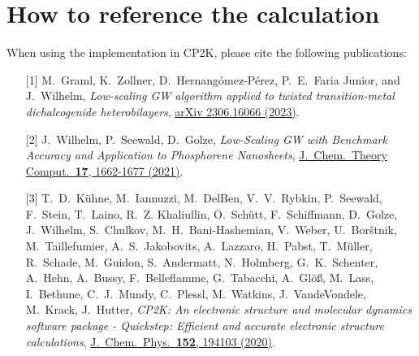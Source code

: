 \documentclass[11pt, a4paper]{scrartcl}
\begin{document}
\section{How to reference the \GW calculation}
When using the \GW implementation in CP2K, please cite the following publications:
\begin{enumerate}[leftmargin=*]

\item[[1{]}] M.~Graml, K.~Zollner, D.~Hernangómez-Pérez, P.~E.~Faria Junior, and J.~Wilhelm, \textit{Low-scaling GW algorithm applied to twisted transition-metal dichalcogenide heterobilayers}, \href{
https://doi.org/10.48550/arXiv.2306.16066}{arXiv 2306.16066 (2023)}.

\item[[2{]}] J.~Wilhelm, P.~Seewald, D.~Golze, \textit{Low-Scaling GW with Benchmark Accuracy and Application to Phosphorene Nanosheets}, \href{https://doi.org/10.1021/acs.jctc.0c01282}{
J.~Chem.~Theory Comput.~\textbf{17}, 1662-1677 (2021)}.


\item[[3{]}] T.~D.~Kühne, M.~Iannuzzi, M.~Del\;Ben, V.~V.~Rybkin, P.~Seewald, F.~Stein, T.~Laino, R.~Z. Khaliullin, O.~Schütt, F.~Schiffmann, D.~Golze, J.~Wilhelm, S.~Chulkov, M.~H.~Bani-Hashe\-mian, V.~Weber,  U.~Bor\v{s}t\-nik, M.~Taillefumier, A.~S.~Jakobovits, A.~Lazzaro, H.~Pabst,  T.~Müller,  R.~Schade, M.~Guidon, S.~Ander\-matt, N.~Holmberg, G.~K.~Schenter, A.~Hehn, A.~Bussy,  F.~Belleflamme, G.~Tabacchi, A.~Glöß, M.~Lass, I.~Bethune, C.~J.~Mundy, C.~Plessl, M.~Watkins, J.~VandeVondele, M.~Krack, J.~Hutter, \textit{CP2K: An electronic structure and molecular dynamics software package - Quickstep: Efficient and accurate electronic structure calculations}, \href{https://doi.org/10.1063/5.0007045}{J.~Chem.~Phys.~\textbf{152}, 194103 (2020)}.


\end{enumerate}
\end{document}
